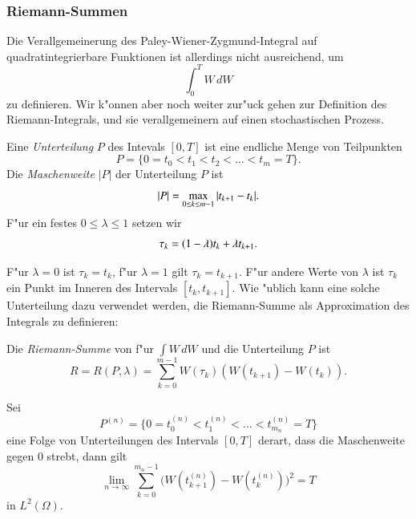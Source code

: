 \subsubsection{Riemann-Summen}
Die Verallgemeinerung des Paley-Wiener-Zygmund-Integral auf
quadratintegrierbare Funktionen ist allerdings nicht ausreichend, um
\[
\int_0^T W\,dW
\]
zu definieren.
Wir k"onnen aber noch weiter zur"uck gehen zur Definition des
Riemann-Integrals, und sie verallgemeinern auf einen stochastischen
Prozess.

\begin{definition}
Eine {\em Unterteilung} $P$ des Intevals $[0,T]$ ist eine endliche Menge
von Teilpunkten
\[
P=\{ 0=t_0<t_1<t_2<\dots<t_m=T\}.
\]
Die {\em Maschenweite} $|P|$ der Unterteilung $P$ ist
\[
|P|=\max_{0\le k\le m-1}|t_{k+1\mathstrut}-t_{k\mathstrut}|.
\]
F"ur ein festes $0\le \lambda\le 1$ setzen wir
\[
\tau_k = (1-\lambda)t_{k\mathstrut}+\lambda t_{k+1\mathstrut}.
\]
%
%
\end{definition}
F"ur $\lambda=0$ ist $\tau_k=t_k$, f"ur $\lambda=1$ gilt $\tau_k=t_{k+1}$.
F"ur andere Werte von $\lambda$ ist $\tau_k$ ein Punkt im Inneren des
Intervals $[t_k,t_{k+1}]$.
Wie "ublich kann eine solche Unterteilung dazu verwendet werden, die 
Riemann-Summe als Approximation des Integrals zu definieren:

\begin{definition}
Die {\em Riemann-Summe} von f"ur $\int W\,dW$ und die Unterteilung $P$ ist
\[
R=R(P,\lambda) = \sum_{k=0}^{m-1} W(\tau_k)(W(t_{k+1})-W(t_k)).
\]
%
\end{definition}

\begin{hilfssatz}
\label{stochastisch:quadrvariation}
Sei
\[
P^{(n)}
=
\{0=t_0^{(n)}<t_1^{(n)}<\dots < t_{m_n}^{(n)}=T\}
\]
eine Folge von Unterteilungen des Intervals $[0,T]$ derart,
dass die Maschenweite gegen $0$ strebt, dann gilt
\[
\lim_{n\to\infty}
\sum_{k=0}^{m_n-1} \bigl(W(t_{k+1}^{(n)})-W(t_{k}^{(n)})\bigr)^2
=T
\]
in $L^2(\Omega)$.
\end{hilfssatz}

